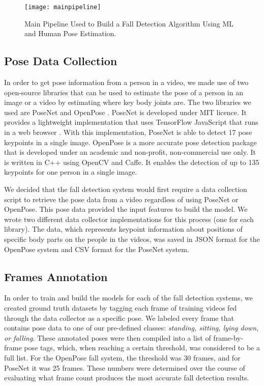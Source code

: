 \begin{figure}
  \texttt{[image: mainpipeline]}
  \caption{Main Pipeline Used to Build a Fall Detection Algorithm Using ML and Human Pose Estimation.}
  \label{fig:mainpipeline}
\end{figure}



\subsection{Pose Data Collection}

In order to get pose information from a person in a video, we made use of two open-source libraries that can be used to estimate the pose of a person in an image or a video by estimating where key body joints are. The two libraries we used are PoseNet \cite{posenet2019} and OpenPose \cite{RN1003}. PoseNet is developed under MIT licence. It provides a lightweight implementation that uses TensorFlow JavaScript that runs in a web browser \cite{posenet2019}. With this implementation, PoseNet is able to detect 17 pose keypoints in a single image. OpenPose is a more accurate pose detection package that is developed under an academic and non-profit, non-commercial use only. It is written in C++ using OpenCV and Caffe. It enables the detection of up to 135 keypoints for one person in a single image.


We decided that the fall detection system would first require a data collection script to retrieve the pose data from a video regardless of using PoseNet or OpenPose. This pose data provided the input features to build the model. We wrote two different data collector implementations for this process (one for each library). The data, which represents keypoint information about positions of specific body parts on the people in the videos, was saved in JSON format for the OpenPose system and CSV format for the PoseNet system.


\subsection{Frames Annotation}


In order to train and build the models for each of the fall detection systems, we created ground truth datasets by tagging each frame of training videos fed through the data collector as a specific pose. We labeled every frame that contains pose data to one of our pre-defined classes: \textit{standing, sitting, lying down, or falling}. These annotated poses were then compiled into a list of frame-by-frame pose tags, which, when reaching a certain threshold, was considered to be a full list. For the OpenPose fall system, the threshold was 30 frames, and for PoseNet it was 25 frames. These numbers were determined over the course of evaluating what frame count produces the most accurate fall detection results.


